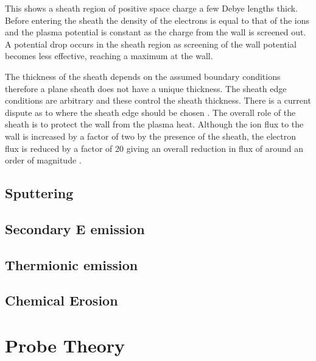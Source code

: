 \documentclass[12pt]{article}
\begin{document}
This shows a sheath region of positive space charge a few Debye lengths thick. Before entering the sheath the density of the electrons is equal to that of the ions and the plasma potential is constant as the charge from the wall is screened out. A potential drop occurs in the sheath region as screening of the wall potential becomes less effective, reaching a maximum at the wall.

The thickness of the sheath depends on the assumed boundary conditions therefore a plane sheath does not have a unique thickness. The sheath edge conditions are  arbitrary and these control the sheath thickness. There is a current dispute as to where the sheath edge should be chosen \cite{0963-0252-18-1-014004}. 
The overall role of the sheath is to protect the wall from the plasma heat. Although the ion flux to the wall is increased by a factor of two by the presence of the sheath, the electron flux is reduced by a factor of 20 giving an overall reduction in flux of around an order of magnitude \cite{picmaster}.

\subsection{Sputtering}
\subsection{Secondary E emission}
\subsection{Thermionic emission}
\subsection{Chemical Erosion}
\section{Probe Theory}
\end{document}
